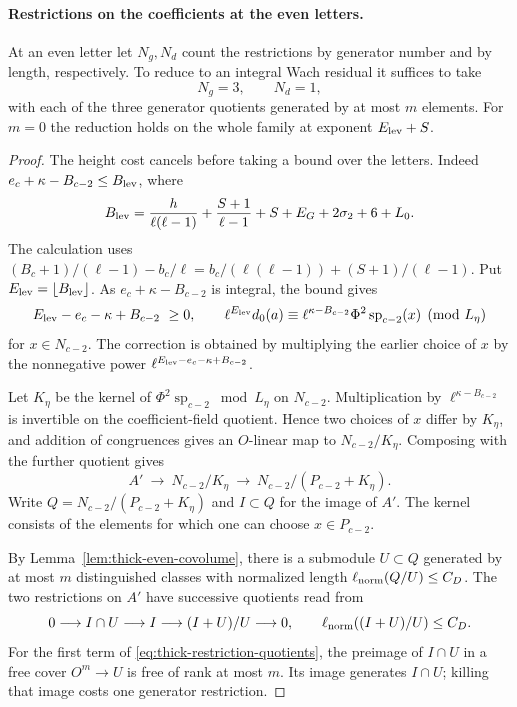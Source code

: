 \paragraph{Restrictions on the coefficients at the even letters.}
\begin{lemma}
At an even letter let \(N_g,N_d\) count the restrictions by generator number and by length, respectively. To reduce to an integral Wach residual it suffices to take
\[
 N_g=3,\qquad N_d=1,
\]
with each of the three generator quotients generated by at most \(m\) elements. For \(m=0\) the reduction holds on the
whole family at exponent \(E_{\rm lev}+S\).
\end{lemma}
\begin{proof}
The height cost cancels before taking a bound over the letters.
Indeed \(e_c+\kappa-B_{c-2}\le B_{\rm lev}\), where
\[
 B_{\rm lev}=\frac{h}{\ell(\ell-1)}+\frac{S+1}{\ell-1}
              +S+E_G+2\sigma_2+6+L_0 .
\]
The calculation uses
\((B_c+1)/(\ell-1)-b_c/\ell
 =b_c/(\ell(\ell-1))+(S+1)/(\ell-1)\).
Put \(E_{\rm lev}=\lfloor B_{\rm lev}\rfloor\).
As \(e_c+\kappa-B_{c-2}\) is integral, the bound gives
\[
  E_{\rm lev}-e_c-\kappa+B_{c-2}\ \ge0,\qquad
  \ell^{E_{\rm lev}}d_0(a)
   \equiv \ell^{\kappa-B_{c-2}}\Phi^2\operatorname{sp}_{c-2}(x)
                      \pmod{L_\eta}
\]
for \(x\in N_{c-2}\). The correction is obtained by multiplying
the earlier choice of \(x\) by the nonnegative power
\(\ell^{E_{\rm lev}-e_c-\kappa+B_{c-2}}\).

Let \(K_\eta\) be the kernel of
\(\Phi^2\operatorname{sp}_{c-2}\bmod L_\eta\) on \(N_{c-2}\).
Multiplication by \(\ell^{\kappa-B_{c-2}}\) is invertible
on the coefficient-field quotient. Hence two choices of \(x\)
differ by \(K_\eta\), and addition of congruences gives an
\(O\)-linear map to \(N_{c-2}/K_\eta\). Composing with the
further quotient gives
\[
 A'\ \longrightarrow\ N_{c-2}/K_\eta\
       \longrightarrow\ N_{c-2}/(P_{c-2}+K_\eta).
\]
Write \(Q=N_{c-2}/(P_{c-2}+K_\eta)\) and \(I\subset Q\) for
the image of \(A'\). The kernel consists of the elements for which
one can choose \(x\in P_{c-2}\).

By Lemma~\ref{lem:thick-even-covolume}, there is a submodule
\(U\subset Q\) generated by at most \(m\) distinguished classes
with normalized length \(\ell_{\rm norm}(Q/U)\le C_D\).
The two restrictions on \(A'\) have successive quotients read from
\begin{equation}\label{eq:thick-restriction-quotients}
 0\longrightarrow I\cap U\longrightarrow I
       \longrightarrow (I+U)/U\longrightarrow0,\qquad
 \ell_{\rm norm}((I+U)/U)\le C_D .
\end{equation}
For the first term of \eqref{eq:thick-restriction-quotients}, the preimage of \(I\cap U\) in a free cover \(O^m\to U\) is free
of rank at most \(m\). Its image generates \(I\cap U\); killing that
image costs one generator restriction.


\end{proof}
